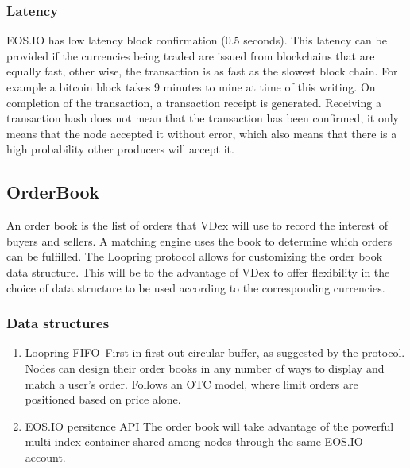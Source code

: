 \documentclass[]{article}
\begin{document}
	\subsubsection{Latency}	
	EOS.IO has low latency block confirmation (0.5 seconds).\cite{3}
	This latency can be provided if the currencies being traded are issued from blockchains that are equally fast, other wise, the transaction is as fast as the slowest block chain.
	For example a bitcoin block takes 9 minutes to mine at time of this writing. On completion of the transaction, a transaction receipt is generated. Receiving a transaction hash does not mean that the transaction has been confirmed, it only means that the node accepted it without error, which also means that there is a high probability other producers will accept it. 

\subsection{OrderBook}
An order book is the list of orders that VDex will use to record the interest of buyers and sellers. A matching engine uses the book to determine which orders can be fulfilled.
The Loopring protocol allows for customizing the order book data structure. \cite{7} This will be to the advantage of VDex to offer flexibility in the choice of data structure to be used according to the corresponding currencies.   
\subsubsection{Data structures}
\begin{enumerate}
\item Loopring FIFO\
	First in first out circular buffer, as suggested by the protocol. Nodes can design their order books in any number of ways to display and match a user's order. Follows an OTC model, where limit orders are positioned based on price alone.
	\cite{7}  
\item EOS.IO persitence API
	The order book will take advantage of the powerful multi index container shared among nodes through the same EOS.IO account.
\end{enumerate}
\end{document}
